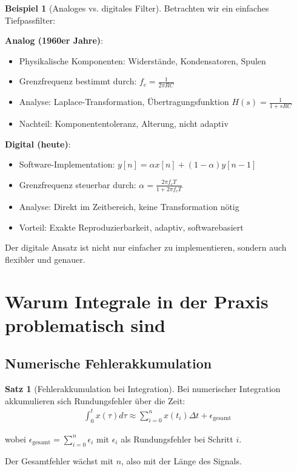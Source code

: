 ﻿\documentclass[a4paper,12pt]{report}
\theoremstyle{definition}
\newtheorem{beispiel}{Beispiel}
\newtheorem{satz}{Satz}
\begin{document}
	\begin{beispiel}[Analoges vs. digitales Filter]
		Betrachten wir ein einfaches Tiefpassfilter:
		
		\textbf{Analog (1960er Jahre)}:
		\begin{itemize}
			\item[-] Physikalische Komponenten: Widerstände, Kondensatoren, Spulen
			\item[-] Grenzfrequenz bestimmt durch: $f_c = \frac{1}{2\pi RC}$
			\item[-] Analyse: Laplace-Transformation, Übertragungsfunktion $H(s) = \frac{1}{1 + sRC}$
			\item[-] Nachteil: Komponententoleranz, Alterung, nicht adaptiv
		\end{itemize}
		
		\textbf{Digital (heute)}:
		\begin{itemize}
			\item[-] Software-Implementation: $y[n] = \alpha x[n] + (1-\alpha)y[n-1]$
			\item[-] Grenzfrequenz steuerbar durch: $\alpha = \frac{2\pi f_c T}{1 + 2\pi f_c T}$
			\item[-] Analyse: Direkt im Zeitbereich, keine Transformation nötig
			\item[-] Vorteil: Exakte Reproduzierbarkeit, adaptiv, softwarebasiert
		\end{itemize}
		
		Der digitale Ansatz ist nicht nur einfacher zu implementieren, sondern auch flexibler und genauer.
	\end{beispiel}
	
	\section{Warum Integrale in der Praxis problematisch sind}
	
	\subsection{Numerische Fehlerakkumulation}
	
	\begin{satz}[Fehlerakkumulation bei Integration]
		Bei numerischer Integration akkumulieren sich Rundungsfehler über die Zeit:
		\begin{align}
			\int_0^t x(\tau) d\tau \approx \sum_{i=0}^{n} x(t_i) \Delta t + \epsilon_{\text{gesamt}}
		\end{align}
		
		wobei $\epsilon_{\text{gesamt}} = \sum_{i=0}^{n} \epsilon_i$ mit $\epsilon_i$ als Rundungsfehler bei Schritt $i$.
		
		Der Gesamtfehler wächst mit $n$, also mit der Länge des Signals.
	\end{satz}
	
\end{document}
